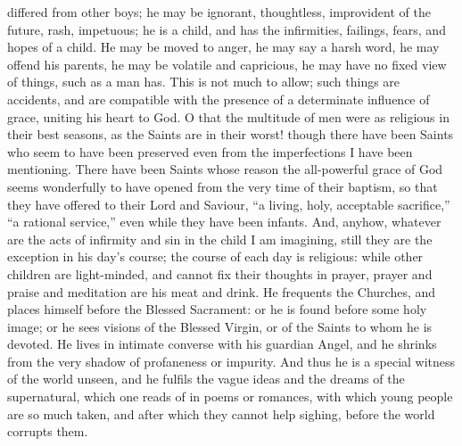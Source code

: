 differed from other boys; he may be ignorant, thoughtless, improvident
of the future, rash, impetuous; he is a child, and has the
infirmities, failings, fears, and hopes of a child. He may be moved to
anger, he may say a harsh word, he may offend his parents, he may be
volatile and capricious, he may have no fixed view of things, such as
a man has. This is not much to allow; such things are accidents, and
are compatible with the presence of a determinate influence of grace,
uniting his heart to God. O that the multitude of men were as
religious in their best seasons, as the Saints are in their worst!
though there have been Saints who seem to have been preserved even
from the imperfections I have been mentioning. There have been Saints
whose reason the all-powerful grace of God seems wonderfully to have
opened from the very time of their baptism, so that they have offered
to their Lord and Saviour, ``a living, holy, acceptable
sacrifice,'' ``a rational service,'' even while they have
been infants. And, anyhow, whatever are the acts of infirmity and sin
in the child I am imagining, still they are the exception in his day's
course; the course of each day is religious: while other children are
light-minded, and cannot fix their thoughts in prayer, prayer and
praise and meditation are his meat and drink. He frequents the
Churches, and places himself before the Blessed Sacrament: or he is
found before some holy image; or he sees visions of the Blessed
Virgin, or of the Saints to whom he is devoted. He lives in intimate
converse with his guardian Angel, and he shrinks from the very shadow
of profaneness or impurity. And thus he is a special witness of the
world unseen, and he fulfils the vague ideas and the dreams of the
supernatural, which one reads of in poems or romances, with which
young people are so much taken, and after which they cannot help
sighing, before the world corrupts them.

